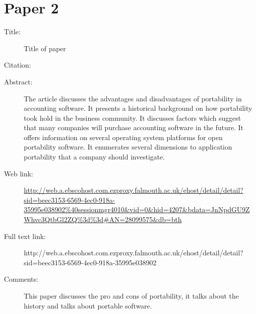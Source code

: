 \documentclass{scrartcl}
\begin{document}
\section*{Paper 2}
\begin{description}
\item[Title:] Title of paper
\item[Citation:] \cite{garen2007software}
\item[Abstract:] The article discusses the advantages and disadvantages of portability in accounting software. It presents a historical background on how portability took hold in the business community. It discusses factors which suggest that many companies will purchase accounting software in the future. It offers information on several operating system platforms for open portability software. It enumerates several dimensions to application portability that a company should investigate.
\item[Web link:] \url{http://web.a.ebscohost.com.ezproxy.falmouth.ac.uk/ehost/detail/detail?sid=beec3153-6569-4ec0-918a-35995e038902%40sessionmgr4010&vid=0&hid=4207&bdata=JnNpdGU9ZWhvc3QtbGl2ZQ%3d%3d#AN=28099575&db=bth}
\item[Full text link:] http://web.a.ebscohost.com.ezproxy.falmouth.ac.uk/ehost/detail/detail?sid=beec3153-6569-4ec0-918a-35995e038902%
\item[Comments:] This paper discusses the pro and cons of portability, it talks about the history and talks about portable software.
\end{description}
\end{document}

